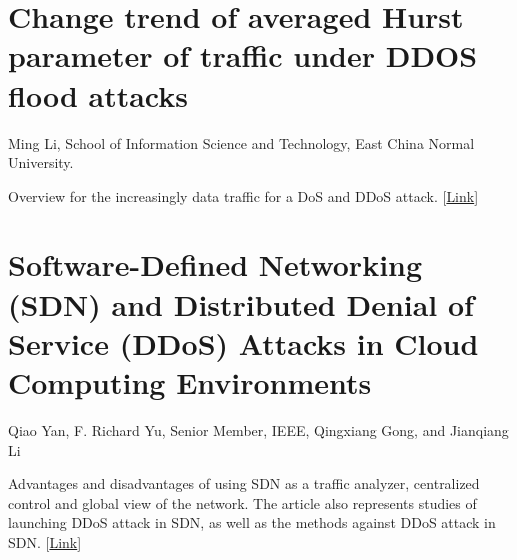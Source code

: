 \documentclass{report}
\begin{document}
\section {Change trend of averaged Hurst parameter of traffic under DDOS flood attacks}
 {\footnotesize Ming Li, School of Information Science and Technology, East China Normal University.}

Overview for the increasingly data traffic for a DoS and DDoS attack.
[\href{http://www.sciencedirect.com/science/article/pii/S0167404805001963}{Link}]
\hfill \break

\section{Software-Defined Networking (SDN) and Distributed Denial of Service (DDoS) Attacks in Cloud Computing Environments }
{\footnotesize Qiao Yan, F. Richard Yu, Senior Member, IEEE, Qingxiang Gong, and Jianqiang Li }

Advantages and disadvantages of using SDN as a traffic analyzer, centralized control and global view of the network. The article also represents studies of launching DDoS attack in SDN, as well as the methods against DDoS attack in SDN.
[\href{http://ieeexplore.ieee.org/abstract/document/7289347}{Link}]
\end{document}
